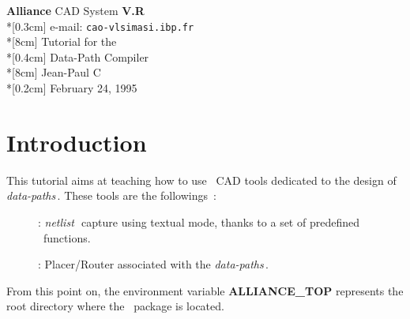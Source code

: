 \newcommand       {\DPDEFLOFIG} {{\tt DP\_DEFLOFIG}}
\newcommand       {\DPSAVLOFIG} {{\tt DP\_SAVLOFIG}}
\newcommand          {\netlist} {{\it netlist\,}}
\newcommand           {\layout} {{\it layout\,}}
\newcommand   {\layoutsymbolic} {{\it symbolic layout\,}}
\newcommand         {\symbolic} {{\it symbolic\,}}
\newcommand       {\behavioral} {{\it behavioral\,}}
\newcommand     {\standartcell} {{\it Standart Cell\,}}
\newcommand              {\drc} {{\it DRC\,}}
\newcommand         {\datapath} {{\it data-path\,}}
\newcommand        {\datapaths} {{\it data-paths\,}}
\newcommand        {\gluelogic} {{\it glue logic\,}}
\newcommand     {\datapathcomp} {{\it data-path compiler\,}}
\newcommand            {\slice} {{\it slice\,}}
\newcommand           {\slices} {{\it slices\,}}
\newcommand            {\track} {{\it track\,}}
\newcommand           {\tracks} {{\it tracks\,}}
\newcommand            {\Width} {{\it Width\,}}
\newcommand            {\Slice} {{\it Slice\,}}
\newcommand      {\bourneshell} {{\it Bourne Shell\,}}
%
%
%
 
 \sloppy %
   \begin{titlepage}
   {
     \begin{center}
       {\LARGE {\bf Alliance} {\sc CAD} System {\bf V.R}}\\*[0.3cm]
       {\LARGE e-mail: {\tt cao-vlsi{\at}masi.ibp.fr}}\\*[8cm]
       {\Huge Tutorial for the}\\*[0.4cm]
       {\Huge Data-Path Compiler}\\*[8cm]
       {\Large Jean-Paul C}\\*[0.2cm]
       {\Large February 24, 1995}
     \end{center}
   }
   \end{titlepage}
   \tableofcontents
   \vfill
   \listoffigures
   \newpage
   \section{Introduction}
   \forceindent
     This tutorial aims at teaching how to use \alliance\ {\sc CAD} tools
   dedicated to the design of \datapaths. These tools are the followings~:
   \begin{description}
     \item[\fpgen]
       : \netlist\ capture using textual mode, thanks to a
       set of predefined \C\ functions.
     \item[\dpr]
       : Placer/Router associated with the \datapaths.
   \end{description}
   \forceindent
     From this point on, the environment variable {\bf ALLIANCE\_TOP} represents the root
   directory where the \alliance\ package is located.
